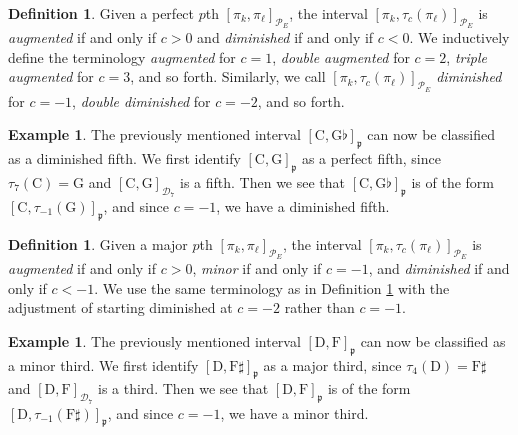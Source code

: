\documentclass{article}
\theoremstyle{plain}
\theoremstyle{definition}
\newtheorem{definition}[theorem]{Definition}
\newtheorem{example}[theorem]{Example}
\theoremstyle{remark}
\begin{document}
\begin{definition}
\label{DEF.Augmented and Diminished Perfect Intervals}
	Given a perfect $p$th $[\pi_k,\pi_\ell]_{\mathcal{P}_E}$, the interval $[\pi_k,\tau_c(\pi_\ell)]_{\mathcal{P}_E}$ is \textit{augmented} if and only if $c>0$ and \textit{diminished} if and only if $c<0$. We inductively define the terminology \textit{augmented} for $c=1$, \textit{double augmented} for $c=2$, \textit{triple augmented} for $c=3$, and so forth. Similarly, we call $[\pi_k,\tau_c(\pi_\ell)]_{\mathcal{P}_E}$ \textit{diminished} for $c=-1$, \textit{double diminished} for $c=-2$, and so forth.
\end{definition}

\begin{example}
	The previously mentioned interval $[\textrm{C},\textrm{G}\flat]_{\mathfrak{p}}$ can now be classified as a diminished fifth. We first identify $[\textrm{C},\textrm{G}]_{\mathfrak{p}}$ as a perfect fifth, since $\tau_7(\textrm{C})=\textrm{G}$ and $[\textrm{C},\textrm{G}]_{\mathcal{D}_7}$ is a fifth. Then we see that $[\textrm{C},\textrm{G}\flat]_{\mathfrak{p}}$ is of the form $[\textrm{C},\tau_{-1}(\textrm{G})]_{\mathfrak{p}}$, and since $c=-1$, we have a diminished fifth.
\end{example}

\begin{definition}
	Given a major $p$th $[\pi_k,\pi_\ell]_{\mathcal{P}_E}$, the interval $[\pi_k,\tau_c(\pi_\ell)]_{\mathcal{P}_E}$ is \textit{augmented} if and only if $c>0$, \textit{minor} if and only if $c=-1$, and \textit{diminished} if and only if $c<-1$. We use the same terminology as in Definition \ref{DEF.Augmented and Diminished Perfect Intervals} with the adjustment of starting diminished at $c=-2$ rather than $c=-1$.
\end{definition}

\begin{example}
	The previously mentioned interval $[\textrm{D},\textrm{F}]_{\mathfrak{p}}$ can now be classified as a minor third. We first identify $[\textrm{D},\textrm{F}\sharp]_{\mathfrak{p}}$ as a major third, since $\tau_4(\textrm{D})=\textrm{F}\sharp$ and $[\textrm{D},\textrm{F}]_{\mathcal{D}_7}$ is a third. Then we see that $[\textrm{D},\textrm{F}]_{\mathfrak{p}}$ is of the form $[\textrm{D},\tau_{-1}(\textrm{F}\sharp)]_{\mathfrak{p}}$, and since $c=-1$, we have a minor third.
\end{example}
\end{document}
